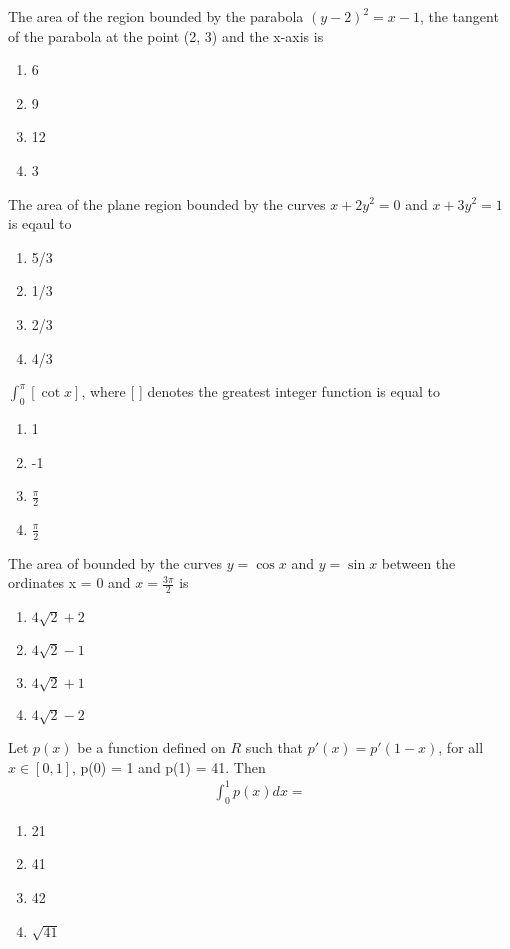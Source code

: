 \item The area of the region bounded by the parabola $(y - 2)^2 = x - 1$, the tangent of the parabola at the point
(2, 3) and the x-axis is
\begin{enumerate}
\item 6
\item 9
\item 12
\item 3
\end{enumerate}

\item The area of the plane region bounded by the curves $x + 2y^2 = 0$ and $x + 3y^2 = 1$ is eqaul to
\begin{enumerate}
\item 5/3
\item 1/3
\item 2/3
\item 4/3
\end{enumerate}

\item $\int_{0}^{\pi}[\cot x]$, where [ ] denotes the greatest integer function is equal to
\begin{enumerate}
\item 1
\item -1
\item $\frac{\pi}{2}$
\item $\frac{\pi}{2}$
\end{enumerate}

\item The area of bounded by the curves $y = \cos x$ and $y = \sin x$ between the ordinates x = 0 and $x = \frac{3\pi}{2} $ is
\begin{enumerate}
\item $4\sqrt{2} + 2$
\item $4\sqrt{2} - 1$
\item $4\sqrt{2} + 1$
\item $4\sqrt{2} - 2$
\end{enumerate}

\item Let $p(x)$ be a function defined on $R$ such that $p'(x) = p'(1 - x)$, for all $x \in [0, 1]$, p(0) = 1 and p(1) = 41. Then
\begin{align*}
\int_{0}^{1}p(x)dx = 
\end{align*}
\begin{enumerate}
\item 21
\item 41
\item 42
\item $\sqrt{41}$
\end{enumerate}

